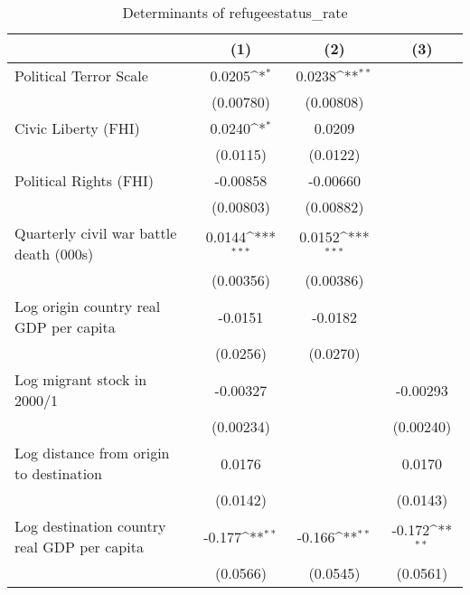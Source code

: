 \begin{table}[htbp]\centering
\def\sym#1{\ifmmode^{#1}\else\(^{#1}\)\fi}
\caption{Determinants of refugeestatus\_rate}
\begin{tabular}{l*{3}{c}}
\hline\hline
                    &\multicolumn{1}{c}{(1)}         &\multicolumn{1}{c}{(2)}         &\multicolumn{1}{c}{(3)}         \\
\hline
Political Terror Scale&      0.0205\sym{*}  &      0.0238\sym{**} &                     \\
                    &   (0.00780)         &   (0.00808)         &                     \\
[1em]
Civic Liberty (FHI) &      0.0240\sym{*}  &      0.0209         &                     \\
                    &    (0.0115)         &    (0.0122)         &                     \\
[1em]
Political Rights (FHI)&    -0.00858         &    -0.00660         &                     \\
                    &   (0.00803)         &   (0.00882)         &                     \\
[1em]
Quarterly civil war battle death (000s)&      0.0144\sym{***}&      0.0152\sym{***}&                     \\
                    &   (0.00356)         &   (0.00386)         &                     \\
[1em]
Log origin country real GDP per capita&     -0.0151         &     -0.0182         &                     \\
                    &    (0.0256)         &    (0.0270)         &                     \\
[1em]
Log migrant stock in 2000/1&    -0.00327         &                     &    -0.00293         \\
                    &   (0.00234)         &                     &   (0.00240)         \\
[1em]
Log distance from origin to destination&      0.0176         &                     &      0.0170         \\
                    &    (0.0142)         &                     &    (0.0143)         \\
[1em]
Log destination country real GDP per capita&      -0.177\sym{**} &      -0.166\sym{**} &      -0.172\sym{**} \\
                    &    (0.0566)         &    (0.0545)         &    (0.0561)         \\

\end{tabular}
\end{table}
